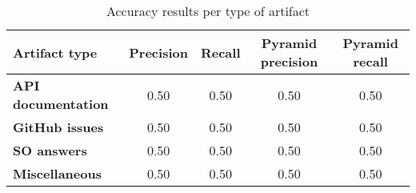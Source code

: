 \begin{table}[H]
\centering    
\begin{scriptsize}
\begin{threeparttable}
\begin{tabular}{lcccc}


\textbf{Artifact type} & 
\textbf{Precision} & \textbf{Recall} & 
\parbox[c][.7cm][c]{1.5cm}{\centering \textbf{Pyramid precision}} & 
\parbox[c][.7cm][c]{1.5cm}{\centering \textbf{Pyramid recall}} \\


\hline

\textbf{API documentation}  &
0.50 & 0.50 & 
0.50 & 0.50 
\\

\textbf{GitHub issues} &
0.50 & 0.50 & 
0.50 & 0.50 
\\

\textbf{SO answers} &
0.50 & 0.50 & 
0.50 & 0.50 
\\

\textbf{Miscellaneous} &
0.50 & 0.50 & 
0.50 & 0.50 
\\
\hline

\end{tabular}
\end{threeparttable}
\end{scriptsize}
\caption{Accuracy results per type of artifact}
\label{tbl:approach-results-artifacts}
\end{table}




